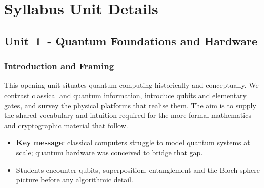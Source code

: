 \section{Syllabus Unit Details}

\subsection*{Unit 1 - Quantum Foundations and Hardware}

\subsubsection*{Introduction and Framing}\label{sec:U1-intro}
This opening unit situates quantum computing historically and conceptually.  
We contrast classical and quantum information, introduce qubits and elementary
gates, and survey the physical platforms that realise them.
The aim is to supply the shared vocabulary and intuition required for the more
formal mathematics and cryptographic material that follow.




\begin{itemize}
	\item \textbf{Key message}: classical computers struggle to model quantum systems at scale; 
	quantum hardware was conceived to bridge that gap.
	\item Students encounter qubits, superposition, entanglement and the Bloch-sphere picture before any algorithmic detail.
\end{itemize}

